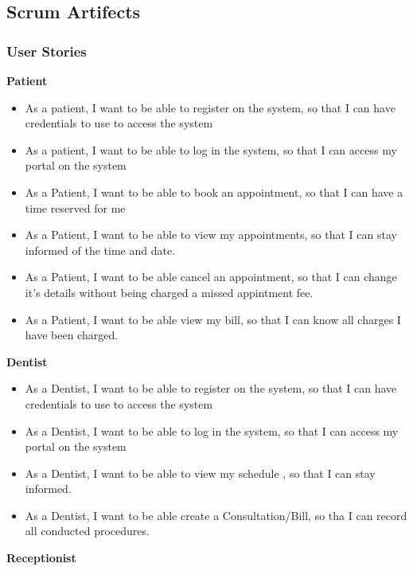 \documentclass[11 pt]{article}
\begin{document}
  \subsection{Scrum Artifects}
  \subsubsection{User Stories}
  \textbf{Patient}
  \begin{itemize}
  \item
  As a patient, I want to be able to register on the system, so that I can have credentials to use to access the system
  \item
  As a patient, I want to be able to log in the system, so that I can access my portal on the system
  \item
  As a Patient, I want to be able to book an appointment, so that I can 				have a time reserved for me
  \item
  As a Patient, I want to be able to view my appointments, so that I can stay informed of the time and date.
  \item
  As a Patient, I want to be able cancel an appointment, so that I can change it's details without being charged a missed appintment fee.
  \item
  As a Patient, I want to be able view my bill, so that I can know all charges I have been charged.
  \end{itemize}
   \textbf{Dentist}
   \begin{itemize}
    \item
  As a Dentist, I want to be able to register on the system, so that I can have credentials to use to access the system
  \item
  As a Dentist, I want to be able to log in the system, so that I can access my portal on the system
  \item
  As a Dentist, I want to be able to view my schedule , so that I can stay informed.
  \item
  As a Dentist, I want to be able create a Consultation/Bill, so tha I can record all conducted procedures.
   \end{itemize}
   
\textbf{Receptionist}
   
\end{document}
